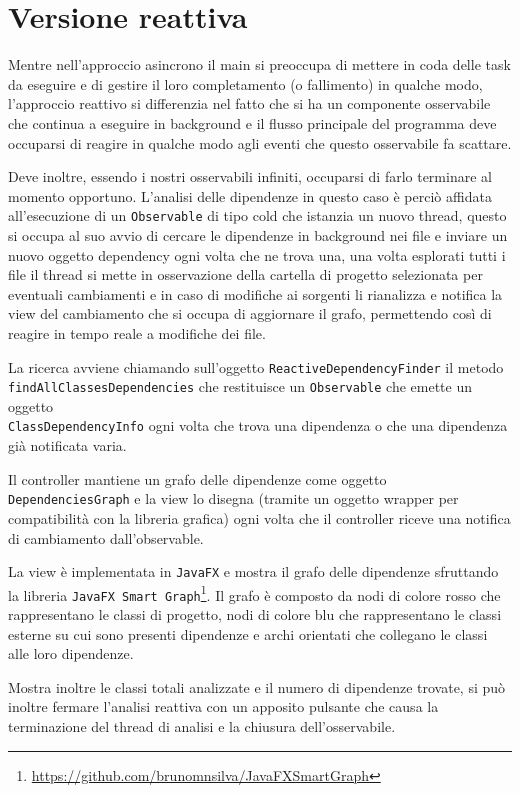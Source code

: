 \documentclass[11pt,notitlepage]{article}
\begin{document}
\section{Versione reattiva}
Mentre nell'approccio asincrono il main si preoccupa di mettere in coda delle task da eseguire e di gestire il loro completamento (o fallimento) in qualche modo, 
l'approccio reattivo si differenzia nel fatto che si ha un componente osservabile che continua a eseguire in background e il flusso principale del programma deve 
occuparsi di reagire in qualche modo agli eventi che questo osservabile fa scattare. 

Deve inoltre, essendo i nostri osservabili infiniti, occuparsi di farlo terminare al momento opportuno. L'analisi delle dipendenze in questo caso è perciò affidata 
all'esecuzione di un \texttt{Observable} di tipo cold che istanzia un nuovo thread, questo si occupa al suo avvio di cercare le dipendenze in background nei file 
e inviare un nuovo oggetto dependency ogni volta che ne trova una, una volta esplorati tutti i file il thread si mette in osservazione della cartella di progetto
selezionata per eventuali cambiamenti e in caso di modifiche ai sorgenti li rianalizza e notifica la view del cambiamento che si occupa di aggiornare il grafo, 
permettendo così di reagire in tempo reale a modifiche dei file. 

La ricerca avviene chiamando sull'oggetto \texttt{ReactiveDependencyFinder} il metodo \\
\texttt{findAllClassesDependencies} che restituisce un \texttt{Observable} che emette un oggetto \\
\texttt{ClassDependencyInfo} ogni volta che trova una dipendenza o che una dipendenza già notificata varia.

Il controller mantiene un grafo delle dipendenze come oggetto \texttt{DependenciesGraph} e la view lo disegna (tramite un oggetto wrapper per compatibilità con la libreria grafica)
ogni volta che il controller riceve una notifica di cambiamento dall'observable.

La view è implementata in \texttt{JavaFX} e mostra il grafo delle dipendenze sfruttando la libreria \texttt{JavaFX Smart Graph}\footnote{\url{https://github.com/brunomnsilva/JavaFXSmartGraph}}.
Il grafo è composto da nodi di colore rosso che rappresentano le classi di progetto, nodi di colore blu che rappresentano le classi esterne su cui sono presenti dipendenze e archi orientati
che collegano le classi alle loro dipendenze.

Mostra inoltre le classi totali analizzate e il numero di dipendenze trovate, si può inoltre fermare l'analisi reattiva con un apposito pulsante che causa la
terminazione del thread di analisi e la chiusura dell'osservabile.
\end{document}

